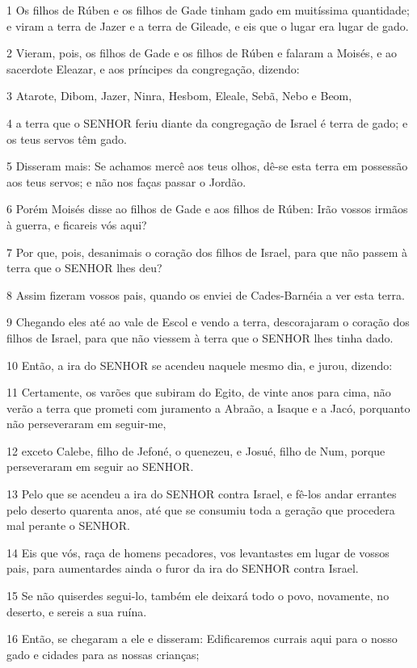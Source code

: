 \par 1 Os filhos de Rúben e os filhos de Gade tinham gado em muitíssima quantidade; e viram a terra de Jazer e a terra de Gileade, e eis que o lugar era lugar de gado.
\par 2 Vieram, pois, os filhos de Gade e os filhos de Rúben e falaram a Moisés, e ao sacerdote Eleazar, e aos príncipes da congregação, dizendo:
\par 3 Atarote, Dibom, Jazer, Ninra, Hesbom, Eleale, Sebã, Nebo e Beom,
\par 4 a terra que o SENHOR feriu diante da congregação de Israel é terra de gado; e os teus servos têm gado.
\par 5 Disseram mais: Se achamos mercê aos teus olhos, dê-se esta terra em possessão aos teus servos; e não nos faças passar o Jordão.
\par 6 Porém Moisés disse ao filhos de Gade e aos filhos de Rúben: Irão vossos irmãos à guerra, e ficareis vós aqui?
\par 7 Por que, pois, desanimais o coração dos filhos de Israel, para que não passem à terra que o SENHOR lhes deu?
\par 8 Assim fizeram vossos pais, quando os enviei de Cades-Barnéia a ver esta terra.
\par 9 Chegando eles até ao vale de Escol e vendo a terra, descorajaram o coração dos filhos de Israel, para que não viessem à terra que o SENHOR lhes tinha dado.
\par 10 Então, a ira do SENHOR se acendeu naquele mesmo dia, e jurou, dizendo:
\par 11 Certamente, os varões que subiram do Egito, de vinte anos para cima, não verão a terra que prometi com juramento a Abraão, a Isaque e a Jacó, porquanto não perseveraram em seguir-me,
\par 12 exceto Calebe, filho de Jefoné, o quenezeu, e Josué, filho de Num, porque perseveraram em seguir ao SENHOR.
\par 13 Pelo que se acendeu a ira do SENHOR contra Israel, e fê-los andar errantes pelo deserto quarenta anos, até que se consumiu toda a geração que procedera mal perante o SENHOR.
\par 14 Eis que vós, raça de homens pecadores, vos levantastes em lugar de vossos pais, para aumentardes ainda o furor da ira do SENHOR contra Israel.
\par 15 Se não quiserdes segui-lo, também ele deixará todo o povo, novamente, no deserto, e sereis a sua ruína.
\par 16 Então, se chegaram a ele e disseram: Edificaremos currais aqui para o nosso gado e cidades para as nossas crianças;
